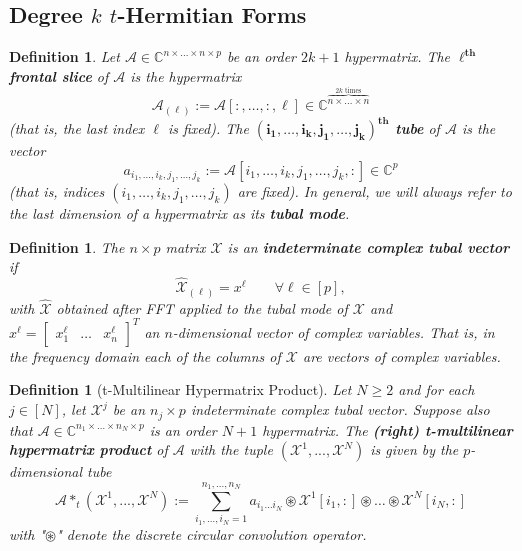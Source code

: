 \documentclass[11pt]{article}
\newtheorem{defn}[theorem]{Definition}
\begin{document}
\subsection{Degree $k$ $t$-Hermitian Forms}
\begin{defn}
    Let $\mathcal{A}\in \mathbb{C}^{n\times...\times n\times p}$ be an order $2k+1$ hypermatrix. The \textbf{$\boldsymbol{\ell^{th}}$ frontal slice} of $\mathcal{A}$ is the hypermatrix 
    \[\mathcal{A}_{(\ell)} := \mathcal{A}[:,\dots,:,\ell]\in \mathbb{C}^{\overbrace{n\times\dots\times n}^{2k\text{ times}}}\]
    (that is, the last index $\ell$ is fixed). The \textbf{$\mathbf{(i_1,\dots,i_k,j_1,\dots,j_k)^{th}}$ tube} of $\mathcal{A}$ is the vector 
    \[a_{i_1,\dots,i_k,j_1,\dots,j_k} := \mathcal{A}[i_1,\dots,i_k,j_1,\dots,j_k,:]\in \mathbb{C}^p\]
    (that is, indices $(i_1,\dots,i_k,j_1,\dots,j_k)$ are fixed). In general, we will always refer to the last dimension of a hypermatrix as its \textbf{tubal mode}. 
\end{defn}
\begin{defn}
    The $n\times p$ matrix $\mathcal{X}$ is an \textbf{indeterminate complex tubal vector} if 
    \[\widehat{\mathcal{X}}_{(\ell)} = x^{\ell}\qquad \forall \ell\in [p],\]
    with $\widehat{\mathcal{X}}$ obtained after FFT applied to the tubal mode of $\mathcal{X}$ and $x^{\ell} = \left[\begin{array}{ccc}
        x_1^{\ell} & \dots & x_n^{\ell}
    \end{array}\right]^T$ an $n$-dimensional vector of complex variables. That is, in the frequency domain each of the columns of $\mathcal{X}$ are vectors of complex variables. 
\end{defn}
\begin{defn}[t-Multilinear Hypermatrix Product]
    Let $N\geq 2$ and for each $j\in [N]$, let $\mathcal{X}^j$ be an $n_j\times p$ indeterminate complex tubal vector. Suppose also that $\mathcal{A}\in \mathbb{C}^{n_1\times\dots \times n_N\times p}$ is an order $N+1$ hypermatrix. The \textbf{(right) t-multilinear hypermatrix product} of $\mathcal{A}$ with the tuple $(\mathcal{X}^1,...,\mathcal{X}^N)$ is given by the $p$-dimensional tube
    \[\mathcal{A}*_t(\mathcal{X}^1,...,\mathcal{X}^N) := \sum\limits_{i_1,\dots,i_N=1}^{n_1,\dots,n_N}a_{i_1\dots i_N}\circledast \mathcal{X}^1[i_1,:]\circledast\dots\circledast\mathcal{X}^N[i_N,:]\]
    with "$\circledast$" denote the discrete circular convolution operator. 
\end{defn}
\end{document}
